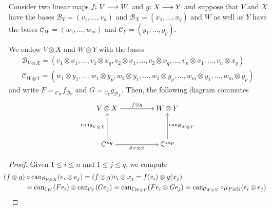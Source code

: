 \documentclass[a4paper, oneside, 12pt]{amsart}
\begin{document}
\begin{proposition}\label{prop:tensor-product-kronecker-product}
  Consider two linear maps \(f\from V\to W\) and \(g\from X\to Y\) and suppose that \(V\) and \(X\) have the bases \(\mathcal{B}_{V} = (v_{1}, \dots , v_{n})\) and \(\mathcal{B}_{X} = (x_{1}, \dots , x_{q})\) and \(W\) as well as \(Y\) have the bases \(\mathcal{C}_{W}= (w_{1}, \dots , w_{m})\) and \(\mathcal{C}_{Y}=(y_{1}, \dots , y_{p})\).

  We endow \(V\otimes X\) and \(W\otimes Y\) with the bases
  \begin{gather*}
    \mathcal{B}_{V\otimes X} = (v_{1}\otimes x_{1}, \dots , v_{1}\otimes x_{q}, v_{2} \otimes x_{1}, \dots , v_{2}\otimes x_{q}, \dots ,v_{n}\otimes x_{1}, \dots , v_{n} \otimes x_{q})\\
    \mathcal{C}_{W\otimes Y} = (w_{1}\otimes y_{1}, \dots , w_{1}\otimes y_{p}, w_{2} \otimes y_{1}, \dots , w_{2}\otimes y_{p}, \dots ,w_{m}\otimes y_{1}, \dots , w_{m} \otimes y_{p})
  \end{gather*}
  and write \(F= {}_{\mathcal{C}_{W}}f_{\mathcal{B}_{V}}\) and \(G = {}_{\mathcal{C}_{Y}}g_{\mathcal{B}_{X}}\).
  Then, the following diagram commutes
  \begin{equation}
    \begin{tikzcd}[ampersand replacement=\&,cramped]
      {V\otimes X} \&\& {W\otimes Y} \\
      \\
      {\mathbb{C}^{nq}} \&\& {\mathbb{C}^{mp}}
      \arrow["{f\otimes g}", from=1-1, to=1-3]
      \arrow["{\can_{\mathcal{B}_{V\otimes X}}}", from=3-1, to=1-1]
      \arrow["{\mu_{F\otimes G}}"', from=3-1, to=3-3]
      \arrow["{\can_{\mathcal{B}_{W\otimes Y}}}"', from=3-3, to=1-3]
    \end{tikzcd}
  \end{equation}
\end{proposition}
\begin{proof}
  Given \(1\leq i \leq n\) and \(1\leq j \leq q\), we compute
  \begin{align*}
    \!\!\!\!\!(f\otimes g)&\circ \operatorname{can}_{\mathcal{B}_{V\otimes X}} (e_{i}\otimes e_{j})
    = (f\otimes g) v_{i}\otimes x_{j}
    = f(v_{i}) \otimes g(x_{j})\\
    & = \operatorname{can}_{\mathcal{C}_{W}}(Fe_{i}) \otimes \operatorname{can}_{\mathcal{C}_{Y}}(Ge_{j})
    = \operatorname{can}_{\mathcal{C}_{W\otimes Y}}( Fe_{i} \otimes Ge_{j})
    = \operatorname{can}_{\mathcal{C}_{W\otimes Y}}\circ \mu_{F\otimes G}(e_{i} \otimes e_{j}) \qedhere
  \end{align*}
\end{proof}
\end{document}
